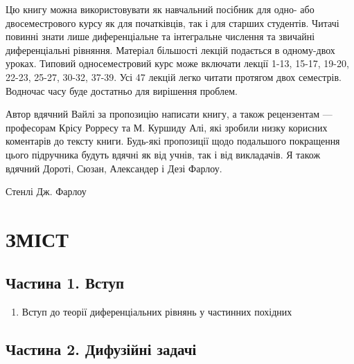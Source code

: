 \documentclass[
  ukrainian,
]{article}
\providecommand{\tightlist}{%
  \setlength{\itemsep}{0pt}\setlength{\parskip}{0pt}}
\begin{document}
Цю книгу можна використовувати як навчальний посібник для одно- або
двосеместрового курсу як для початківців, так і для старших студентів.
Читачі повинні знати лише диференціальне та інтегральне числення та
звичайні диференціальні рівняння. Матеріал більшості лекцій подається в
одному-двох уроках. Типовий односеместровий курс може включати лекції
1-13, 15-17, 19-20, 22-23, 25-27, 30-32, 37-39. Усі 47 лекцій легко
читати протягом двох семестрів. Водночас часу буде достатньо для
вирішення проблем.

Автор вдячний Вайлі за пропозицію написати книгу, а також рецензентам
--- професорам Крісу Рорресу та М. Куршиду Алі, які зробили низку
корисних коментарів до тексту книги. Будь-які пропозиції щодо подальшого
покращення цього підручника будуть вдячні як від учнів, так і від
викладачів. Я також вдячний Дороті, Сюзан, Александер і Дезі Фарлоу.

Стенлі Дж. Фарлоу

\section{ЗМІСТ}\label{ux437ux43cux456ux441ux442}

\subsection{Частина 1.
Вступ}\label{ux447ux430ux441ux442ux438ux43dux430-1.-ux432ux441ux442ux443ux43f}

\begin{enumerate}
\def\labelenumi{\arabic{enumi}.}
\tightlist
\item
  Вступ до теорії диференціальних рівнянь у частинних похідних
\end{enumerate}

\subsection{Частина 2. Дифузійні
задачі}\label{ux447ux430ux441ux442ux438ux43dux430-2.-ux434ux438ux444ux443ux437ux456ux439ux43dux456-ux437ux430ux434ux430ux447ux456}
\end{document}
